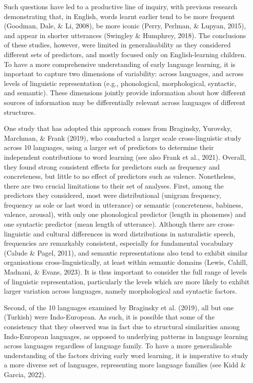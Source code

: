 \documentclass[10pt, letterpaper]{article}
\begin{document}
Such questions have led to a productive line of inquiry, with previous
research demonstrating that, in English, words learnt earlier tend to be
more frequent (Goodman, Dale, \& Li, 2008), be more iconic (Perry,
Perlman, \& Lupyan, 2015), and appear in shorter utterances (Swingley \&
Humphrey, 2018). The conclusions of these studies, however, were limited
in generalisability as they considered different sets of predictors, and
mostly focused only on English-learning children. To have a more
comprehensive understanding of early language learning, it is important
to capture two dimensions of variability: across languages, and across
levels of linguistic representation (e.g., phonological, morphological,
syntactic, and semantic). These dimensions jointly provide information
about how different sources of information may be differentially
relevant across languages of different structures.

One study that has adopted this approach comes from Braginsky, Yurovsky,
Marchman, \& Frank (2019), who conducted a larger scale cross-linguistic
study across 10 languages, using a larger set of predictors to determine
their independent contributions to word learning (see also Frank et al.,
2021). Overall, they found strong consistent effects for predictors such
as frequency and concreteness, but little to no effect of predictors
such as valence. Nonetheless, there are two crucial limitations to their
set of analyses. First, among the predictors they considered, most were
distributional (unigram frequency, frequency as sole or last word in
utterance) or semantic (concreteness, babiness, valence, arousal), with
only one phonological predictor (length in phonemes) and one syntactic
predictor (mean length of utterance). Although there are
cross-linguistic and cultural differences in word distributions in
naturalistic speech, frequencies are remarkably consistent, especially
for fundamental vocabulary (Calude \& Pagel, 2011), and semantic
representations also tend to exhibit similar organisations
cross-linguistically, at least within semantic domains (Lewis, Cahill,
Madnani, \& Evans, 2023). It is thus important to consider the full
range of levels of linguistic representation, particularly the levels
which are more likely to exhibit larger variation across languages,
namely morphological and syntactic factors.

Second, of the 10 languages examined by Braginsky et al. (2019), all but
one (Turkish) were Indo-European. As such, it is possible that some of
the consistency that they observed was in fact due to structural
similarities among Indo-European languages, as opposed to underlying
patterns in language learning across languages regardless of language
family. To have a more generalisable understanding of the factors
driving early word learning, it is imperative to study a more diverse
set of languages, representing more language families (see Kidd \&
Garcia, 2022).
\end{document}
